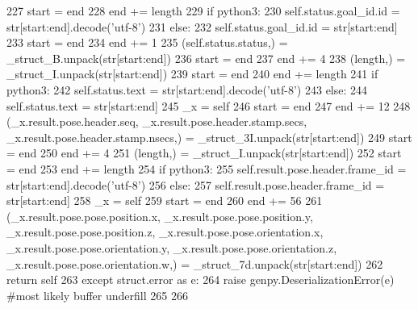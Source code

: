 \begin{DoxyCode}
227       start = end
228       end += length
229       \textcolor{keywordflow}{if} python3:
230         self.status.goal\_id.id = str[start:end].decode(\textcolor{stringliteral}{'utf-8'})
231       \textcolor{keywordflow}{else}:
232         self.status.goal\_id.id = str[start:end]
233       start = end
234       end += 1
235       (self.status.status,) = \_struct\_B.unpack(str[start:end])
236       start = end
237       end += 4
238       (length,) = \_struct\_I.unpack(str[start:end])
239       start = end
240       end += length
241       \textcolor{keywordflow}{if} python3:
242         self.status.text = str[start:end].decode(\textcolor{stringliteral}{'utf-8'})
243       \textcolor{keywordflow}{else}:
244         self.status.text = str[start:end]
245       \_x = self
246       start = end
247       end += 12
248       (\_x.result.pose.header.seq, \_x.result.pose.header.stamp.secs, \_x.result.pose.header.stamp.nsecs,) = 
      \_struct\_3I.unpack(str[start:end])
249       start = end
250       end += 4
251       (length,) = \_struct\_I.unpack(str[start:end])
252       start = end
253       end += length
254       \textcolor{keywordflow}{if} python3:
255         self.result.pose.header.frame\_id = str[start:end].decode(\textcolor{stringliteral}{'utf-8'})
256       \textcolor{keywordflow}{else}:
257         self.result.pose.header.frame\_id = str[start:end]
258       \_x = self
259       start = end
260       end += 56
261       (\_x.result.pose.pose.position.x, \_x.result.pose.pose.position.y, \_x.result.pose.pose.position.z, 
      \_x.result.pose.pose.orientation.x, \_x.result.pose.pose.orientation.y, \_x.result.pose.pose.orientation.z, 
      \_x.result.pose.pose.orientation.w,) = \_struct\_7d.unpack(str[start:end])
262       \textcolor{keywordflow}{return} self
263     \textcolor{keywordflow}{except} struct.error \textcolor{keyword}{as} e:
264       \textcolor{keywordflow}{raise} genpy.DeserializationError(e) \textcolor{comment}{#most likely buffer underfill}
265 
266 
\end{DoxyCode}
